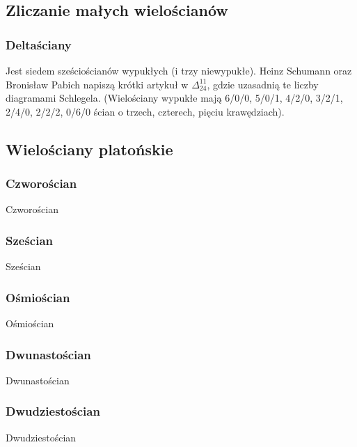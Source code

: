 \subsection{Zliczanie małych wielościanów}
\subsubsection{Deltaściany}


Jest siedem sześciościanów wypukłych (i trzy niewypukłe).
Heinz Schumann oraz Bronisław Pabich napiszą krótki artykuł w $\Delta_{24}^{11}$, gdzie uzasadnią te liczby diagramami Schlegela.
%
(Wielościany wypukłe mają 6/0/0, 5/0/1, 4/2/0, 3/2/1, 2/4/0, 2/2/2, 0/6/0 ścian o trzech, czterech, pięciu krawędziach).

\subsection{Wielościany platońskie}

\subsubsection{Czworościan}
Czworościan

\subsubsection{Sześcian}
Sześcian

\subsubsection{Ośmiościan}
Ośmiościan

\subsubsection{Dwunastościan}
Dwunastościan

\subsubsection{Dwudziestościan}
Dwudziestościan


